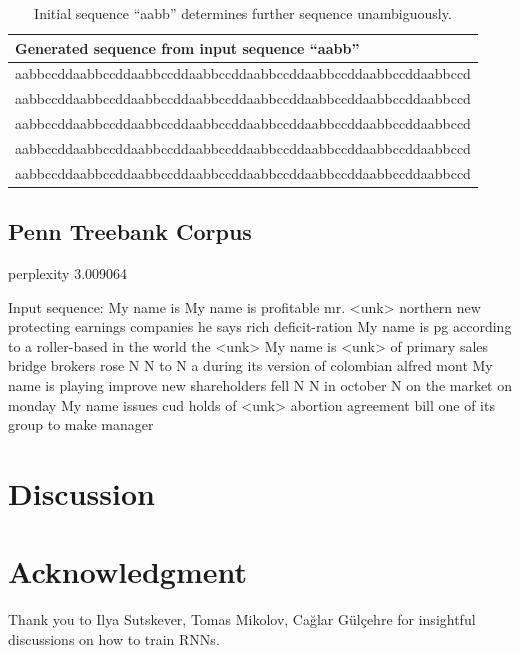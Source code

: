 \documentclass{article}
\begin{document}
\begin{table}[t]
\tiny
\centering
\begin{tabular}{l}
\hline
Generated sequence from input sequence ``aabb'' \\
\hline
 aabbccddaabbccddaabbccddaabbccddaabbccddaabbccddaabbccddaabbccd\\
 aabbccddaabbccddaabbccddaabbccddaabbccddaabbccddaabbccddaabbccd\\
 aabbccddaabbccddaabbccddaabbccddaabbccddaabbccddaabbccddaabbccd\\
 aabbccddaabbccddaabbccddaabbccddaabbccddaabbccddaabbccddaabbccd\\
 aabbccddaabbccddaabbccddaabbccddaabbccddaabbccddaabbccddaabbccd\\
\hline
\end{tabular}
\caption{Initial sequence ``aabb'' determines further sequence unambiguously.}
        \label{tab:aabb}
\end{table}



\subsection{Penn Treebank Corpus}
perplexity 3.009064


Input sequence: My name is
 My name is profitable mr. <unk> northern new protecting earnings companies he says rich deficit-ration
 My name is pg according to a roller-based in the world the <unk>
 My name is <unk> of primary sales bridge brokers rose N N to N a during its version of colombian alfred mont
 My name is playing improve new shareholders fell N N in october N on the market on monday
 My name issues cud holds of <unk> abortion agreement bill one of its group to make manager


\section{Discussion}

\section{Acknowledgment}
Thank you to Ilya Sutskever, Tomas Mikolov, Cağlar Gülçehre for insightful discussions on how to train RNNs.



\end{document}
